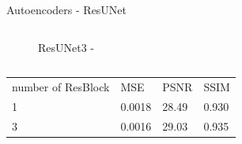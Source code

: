 \documentclass{beamer}
\begin{document}
\begin{frame}{Autoencoders - ResUNet\cite{unet}\cite{resnet}}
{\begin{columns}
\begin{column}[c]{0.45\paperwidth}
\begin{figure}
                    \caption{ResUNet3 - }
                \end{figure}                        
            \end{column}
        \end{columns}
        \begin{center}
            \tiny
            \begin{tabularx}{0.5\columnwidth}{XXXX}
                \centering
                number of ResBlock & MSE & PSNR & SSIM \\
                1 & 0.0018 & 28.49 & 0.930 \\
                3 & 0.0016 & 29.03 & 0.935
            \end{tabularx}                
        \end{center}
    }
\end{frame}
\end{document}
